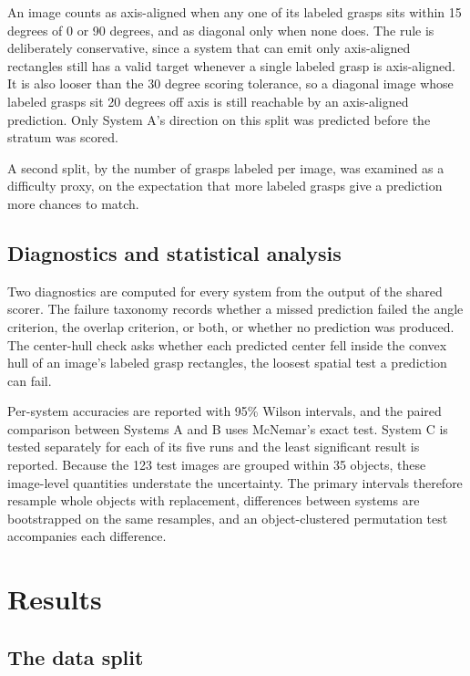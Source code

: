 \documentclass[12pt,letterpaper]{article}
\begin{document}
An image counts as axis-aligned when any one of its labeled grasps sits
within 15 degrees of 0 or 90 degrees, and as diagonal only when none
does. The rule is deliberately conservative, since a system that can
emit only axis-aligned rectangles still has a valid target whenever a
single labeled grasp is axis-aligned. It is also looser than the 30
degree scoring tolerance, so a diagonal image whose labeled grasps sit
20 degrees off axis is still reachable by an axis-aligned prediction.
Only System A's direction on this split was predicted before the stratum
was scored.

A second split, by the number of grasps labeled per image, was examined
as a difficulty proxy, on the expectation that more labeled grasps give
a prediction more chances to match.

\subsection{Diagnostics and statistical analysis}

Two diagnostics are computed for every system from the output of the
shared scorer. The failure taxonomy records whether a missed prediction
failed the angle criterion, the overlap criterion, or both, or whether
no prediction was produced. The center-hull check asks whether each
predicted center fell inside the convex hull of an image's labeled grasp
rectangles, the loosest spatial test a prediction can fail.

Per-system accuracies are reported with 95\% Wilson intervals, and the
paired comparison between Systems A and B uses McNemar's exact test.
System C is tested separately for each of its five runs and the least
significant result is reported. Because the 123 test images are grouped
within 35 objects, these image-level quantities understate the
uncertainty. The primary intervals therefore resample whole objects with
replacement, differences between systems are bootstrapped on the same
resamples, and an object-clustered permutation test accompanies each
difference.

\section{Results}\label{sec:results}

\subsection{The data split}
\end{document}
